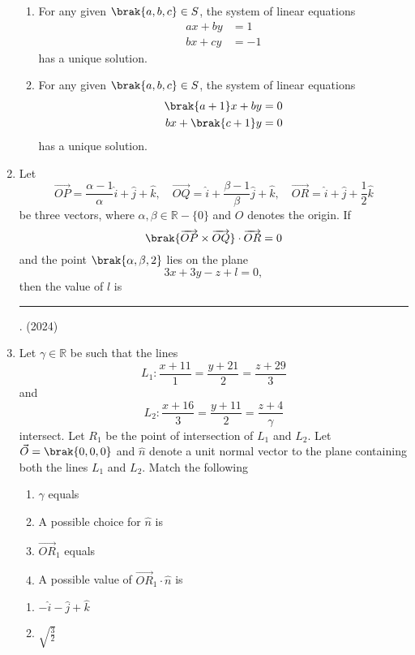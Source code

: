 \begin{enumerate}[label=\thesubsection.\arabic*.,ref=\thesubsection.\theenumi]
\begin{enumerate}
\item For any given $ \brak{a, b, c} \in S $, the system of linear equations
        \begin{align*}
        ax + by &= 1 \\
        bx + cy &= -1
        \end{align*}
        has a unique solution.
\item For any given $ \brak{a, b, c} \in S $, the system of linear equations
        \begin{align*}
        \brak{a+1}x + by &= 0 \\
        bx + \brak{c+1}y &= 0
        \end{align*}
        has a unique solution.
    \end{enumerate}
\item Let  
\[\overrightarrow{OP} = \frac{\alpha -1}{\alpha} \hat{i} + \hat{j} + \hat{k}, \quad
    \overrightarrow{OQ} = \hat{i} + \frac{\beta -1}{\beta} \hat{j} + \hat{k}, \quad
    \overrightarrow{OR} = \hat{i} + \hat{j} + \frac{1}{2} \hat{k}
\]
    be three vectors, where $\alpha, \beta \in \mathbb{R} - \{0\}$ and $O$ denotes the origin.  
    If  
\[
    \brak{ \overrightarrow{OP} \times \overrightarrow{OQ} } \cdot \overrightarrow{OR} = 0
\]
    and the point $\brak{\alpha, \beta, 2}$ lies on the plane  
\[
    3x + 3y - z + l = 0,
\]
    then the value of $l$ is \rule{1cm}{0.1pt}.
\hfill (2024)
\item Let $\gamma\in\mathbb{R}$ be such that the lines
\[L_{1}:\frac{x+11}{1}=\frac{y+21}{2}=\frac{z+29}{3}\]
and
\[L_{2}:\frac{x+16}{3}=\frac{y+11}{2}=\frac{z+4}{\gamma}\]
intersect. Let $R_{1}$ be the point of intersection of $L_{1}$ and $L_{2}$. Let $\vec{O}=\brak{0,0,0}$ and $\hat{n}$ denote a unit normal vector to the plane containing both the lines $L_{1}$ and $L_{2}$.
Match the following
\begin{multicols}{2}
	\begin{enumerate}[label=(\Alph*)]
		\item  $\gamma$ equals                    
		\item  A possible choice for $\hat{n}$ is 
		\item  $\vec{OR}_{1}$ equals              
		\item  A possible value of $\vec{OR}_{1}\cdot\hat{n}$ is 
\end{enumerate}
\columnbreak
	\begin{enumerate}[label=(\arabic*)]
\item  $-\hat{i}-\hat{j}+\hat{k}$ 
\item  $\sqrt{\frac{3}{2}}$ 

\end{enumerate}
\end{multicols}
\end{enumerate}
